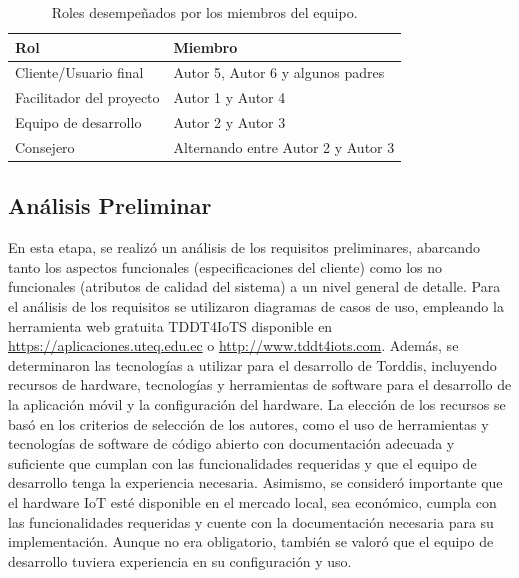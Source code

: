 \documentclass[a4paper,fleqn]{cas-sc}
\begin{document}
	\begin{table}[H]
		\caption{Roles desempeñados por los miembros del equipo.\label{tab:Roles}}
		\begin{tabularx}{0.8\textwidth}{>{\arraybackslash}X >{\arraybackslash}X}
			\toprule
			\textbf{Rol}	& \textbf{Miembro}\\
			\midrule
			Cliente/Usuario final & Autor 5, Autor 6 y algunos padres\\
			Facilitador del proyecto		&  Autor 1 y Autor 4\\
			Equipo de desarrollo		&  Autor 2 y Autor 3\\
			Consejero		&  Alternando entre Autor 2 y Autor 3\\
			\bottomrule
		\end{tabularx}
	\end{table}
	
	\subsection{Análisis Preliminar}
	En esta etapa, se realizó un análisis de los requisitos preliminares, abarcando tanto los aspectos funcionales (especificaciones del cliente) como los no funcionales (atributos de calidad del sistema) a un nivel general de detalle. Para el análisis de los requisitos se utilizaron diagramas de casos de uso, empleando la herramienta web gratuita TDDT4IoTS disponible en \href{https://aplicaciones.uteq.edu.ec}{https://aplicaciones.uteq.edu.ec} o \href{http://www.tddt4iots.com}{http://www.tddt4iots.com}. Además, se determinaron las tecnologías a utilizar para el desarrollo de Torddis, incluyendo recursos de hardware, tecnologías y herramientas de software para el desarrollo de la aplicación móvil y la configuración del hardware. La elección de los recursos se basó en los criterios de selección de los autores, como el uso de herramientas y tecnologías de software de código abierto con documentación adecuada y suficiente que cumplan con las funcionalidades requeridas y que el equipo de desarrollo tenga la experiencia necesaria. Asimismo, se consideró importante que el hardware IoT esté disponible en el mercado local, sea económico, cumpla con las funcionalidades requeridas y cuente con la documentación necesaria para su implementación. Aunque no era obligatorio, también se valoró que el equipo de desarrollo tuviera experiencia en su configuración y uso.
	
\end{document}
